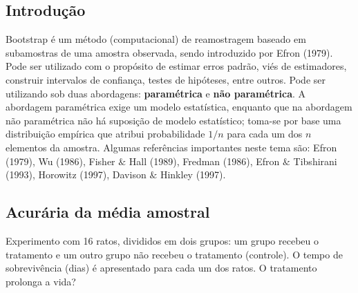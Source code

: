 \documentclass[
  letterpaper,
  DIV=11,
  numbers=noendperiod]{scrreprt}
\begin{document}
\subsection{Introdução}\label{introduuxe7uxe3o-2}

Bootstrap é um método (computacional) de reamostragem baseado em
subamostras de uma amostra observada, sendo introduzido por Efron
(1979). Pode ser utilizado com o propósito de estimar erros padrão, viés
de estimadores, construir intervalos de confiança, testes de hipóteses,
entre outros. Pode ser utilizando sob duas abordagens:
\textbf{paramétrica} e \textbf{não paramétrica}. A abordagem paramétrica
exige um modelo estatística, enquanto que na abordagem não paramétrica
não há suposição de modelo estatístico; toma-se por base uma
distribuição empírica que atribui probabilidade \(1/n\) para cada um dos
\(n\) elementos da amostra. Algumas referências importantes neste tema
são: Efron (1979), Wu (1986), Fisher \(\&\) Hall (1989), Fredman (1986),
Efron \(\&\) Tibshirani (1993), Horowitz (1997), Davison \(\&\) Hinkley
(1997).

\subsection{Acurária da média
amostral}\label{acuruxe1ria-da-muxe9dia-amostral}

Experimento com 16 ratos, divididos em dois grupos: um grupo recebeu o
tratamento e um outro grupo não recebeu o tratamento (controle). O tempo
de sobrevivência (dias) é apresentado para cada um dos ratos. O
tratamento prolonga a vida?
\end{document}
